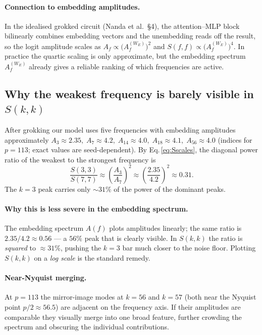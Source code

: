 \documentclass[11pt]{article}
\begin{document}
\paragraph{Connection to embedding amplitudes.}
In the idealised grokked circuit (Nanda et al.\ \S4), the attention--MLP block
bilinearly combines embedding vectors and the unembedding reads off the result,
so the logit amplitude scales as $A_f \propto \bigl(A^{(W_E)}_f\bigr)^2$ and
$S(f,f)\propto \bigl(A^{(W_E)}_f\bigr)^4$.
In practice the quartic scaling is only approximate, but the embedding spectrum
$A^{(W_E)}_f$ already gives a reliable ranking of which frequencies are active.

\subsection{Why the weakest frequency is barely visible in $S(k,k)$}
\label{sec:weak-freq}

After grokking our model uses five frequencies with embedding amplitudes
approximately
$A_3\approx 2.35,\;A_7\approx 4.2,\;A_{14}\approx 4.0,\;
 A_{18}\approx 4.1,\;A_{56}\approx 4.0$
(indices for $p=113$; exact values are seed-dependent).
By Eq.\,\eqref{eq:Sscales}, the diagonal power ratio of the weakest
to the strongest frequency is
\begin{equation}
    \frac{S(3,3)}{S(7,7)}
    \approx \left(\frac{A_3}{A_7}\right)^{\!2}
    \approx \left(\frac{2.35}{4.2}\right)^{\!2}
    \approx 0.31.
\end{equation}
The $k=3$ peak carries only $\sim 31\%$ of the power of the dominant peaks.

\paragraph{Why this is less severe in the embedding spectrum.}
The embedding spectrum $A(f)$ plots amplitudes linearly; the same ratio is
$2.35/4.2 \approx 0.56$ --- a $56\%$ peak that is clearly visible.
In $S(k,k)$ the ratio is \emph{squared} to $\approx 31\%$, pushing the
$k=3$ bar much closer to the noise floor.  Plotting $S(k,k)$ on a
\emph{log scale} is the standard remedy.

\paragraph{Near-Nyquist merging.}
At $p=113$ the mirror-image modes at $k=56$ and $k=57$ (both near the
Nyquist point $p/2\approx 56.5$) are adjacent on the frequency axis.
If their amplitudes are comparable they visually merge into one broad
feature, further crowding the spectrum and obscuring the individual
contributions.
\end{document}
